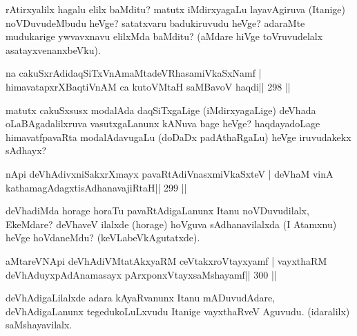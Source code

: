 \begin{artha}
rAtirxyalilx hagalu elilx baMditu? matutx iMdirxyagaLu layavAgiruva (Itanige) noVDuvudeMbudu heVge? satatxvaru badukiruvudu heVge? adaraMte mudukarige ywvavxnavu elilxMda baMditu? (aMdare hiVge toVruvudelalx asatayxvenanxbeVku).
\end{artha}


\begin{shl}
na cakuSxrAdidaqSiTxVnAmaMtadeVRhasamiVkaSxNamf |
himavatapxrXBaqtiVnAM ca kutoV\s MtaH saMBavoV haqdi\hfill || 298 ||
\end{shl}

\begin{artha}
matutx cakuSxsusx modalAda daqSiTxgaLige (iMdirxyagaLige) deVhada oLaBAgadalilxruva vasutxgaLanunx kANuva bage heVge? haqdayadoLage himavatfpavaRta modalAdavugaLu (doDaDx padAthaRgaLu) heVge iruvudakekx sAdhayx?
\end{artha}


\begin{shl}
nApi deVhAdivxniSakxrXmayx pavaRtAdiVnasxmiVkaSxteV |
deVhaM vinA kathamagAdagxtisAdhanavajiRtaH\hfill || 299 ||
\end{shl}

\begin{artha}
deVhadiMda horage horaTu pavaRtAdigaLanunx Itanu noVDuvudilalx, EkeMdare? deVhaveV ilalxde (horage) hoVguva sAdhanavilalxda (I Atamxnu) heVge hoVdaneMdu? (keVLabeVkAgutatxde).
\end{artha}


\begin{shl}
aMtareVNApi deVhAdiVMtatAkxyaRM ceVtakxroVtayxyamf |
vayxthaRM deVhAduyxpAdAnamasayx pArxponxVtayxsaMshayamf\hfill || 300 ||
\end{shl}

\begin{artha}
deVhAdigaLilalxde adara kAyaRvanunx Itanu mADuvudAdare, deVhAdigaLanunx tegedukoLuLxvudu Itanige vayxthaRveV Aguvudu. (idaralilx) saMshayavilalx.
\end{artha}

